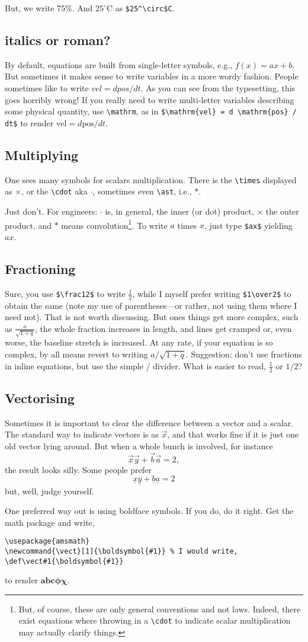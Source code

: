 \documentclass{article}
\begin{document}
But, we write 75\%. And $25^\circ$C as \verb+$25^\circ$C+.


\subsection{italics or roman?}
By default, equations are built from single-letter symbols, e.g., $f(x) = ax+b$.  But sometimes it makes
sense to write variables in a more wordy fashion.  People sometimes like to write $vel = d pos / d t$.  As
you can see from the typesetting, this goes horribly wrong!  If you really need to write multi-letter
variables describing some physical quantity, use \verb+\mathrm+, as in
\verb+$\mathrm{vel} = d \mathrm{pos} / dt$+ to render $\mathrm{vel} = d \mathrm{pos} / dt$.

\subsection{Multiplying}
One sees many symbols for scalars multiplication.  There is the \verb+\times+ displayed as $\times$,
or the \verb+\cdot+ aka $\cdot$, sometimes even \verb+\ast+, i.e., $\ast$.

Just don't.  For engineers: $\cdot$ is, in general, the inner (or dot) product, $\times$ the 
outer product, and $\ast$ means convolution\footnote{But, of course, these are only
general conventions and not laws.  Indeed, there exist equations where throwing in
a \verb+\cdot+ to indicate scalar multiplication may actually clarify things.}. To write
$a$ times $x$, just type \verb+$ax$+ yielding $ax$.


\subsection{Fractioning}
Sure, you use \verb+$\frac12$+ to write $\frac12$, while I myself prefer writing \verb+$1\over2$+ to obtain
the same (note my use of parentheses---or rather, not using them where I need not).
That is not worth discussing.  But ones things get more complex, such as $\frac a{\sqrt{1+q}}$, the whole
fraction increases in length, and lines get cramped or, even worse, the baseline stretch is increased.
At any rate, if your equation is so complex, by all means revert to writing $a/{\sqrt{1+q}}$.   Suggestion:
don't use fractions in inline equations, but use the simple / divider.  What is easier
to read, $\frac12$ or $1/2$?

\subsection{Vectorising}
Sometimes it is important to clear the difference between a vector and a scalar.
The standard way to indicate vectors is as $\vec x$, and that works fine if it is 
just one old vector lying around.  But when a whole bunch is involved, for instance
$$ \vec x \vec y + \vec b \vec a = 2,$$ the result looks silly.  Some people
prefer $$ \underline x \underline y + \underline b \underline a = 2$$ but, well,
judge yourself.  

One preferred way out is using boldface symbols.  If you do, do it right.  Get the \AmS math package and write,
\begin{verbatim}
\usepackage{amsmath}
\newcommand{\vect}[1]{\boldsymbol{#1}} % I would write, \def\vect#1{\boldsymbol{#1}}
\end{verbatim}
to render $\boldsymbol{abc\phi\chi}$.
\end{document}
